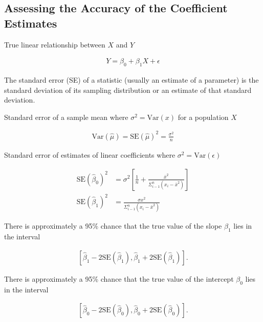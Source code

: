 \documentclass[]{article}
\newcommand{\var}{\mathrm{Var}}
\newcommand{\se}{\mathrm{SE}}
\begin{document}
\subsection{Assessing the Accuracy of the Coefficient
Estimates}\label{assessing-the-accuracy-of-the-coefficient-estimates}

True linear relationship between \(X\) and \(Y\)

\begin{align}
    Y = \beta_0 + \beta_1 X + \epsilon
\end{align}

The standard error (SE) of a statistic (usually an estimate of a
parameter) is the standard deviation of its sampling distribution or an
estimate of that standard deviation.

Standard error of a sample mean where \(\sigma^2 = \var(x)\) for a
population \(X\)

\begin{align}
    \var\left(\hat{\mu}\right) = \se\left(\hat{\mu}\right)^2 = \frac{\sigma^2}{n}
\end{align}

Standard error of estimates of linear coefficients where
\(\sigma^2 = \var(\epsilon)\)

\begin{align}
    \se\left(\hat{\beta}_0\right)^2 & = 
        \sigma^2\left[ 
            \frac{1}
                     {n} + 
            \frac{\bar{x}^2}
                     {\Sigma_{i - 1}^n\left(x_i - \bar{x}^2\right)} \right] 
            \nonumber \\
    \se\left(\hat{\beta}_1\right)^2 & = 
         \frac{\sigma{x}^2}
                    {\Sigma_{i - 1}^n \left(x_i - \bar{x}^2\right)}
\end{align}

There is approximately a 95\% chance that the true value of the slope
\(\beta_1\) lies in the interval

\begin{align}
    \left[  \hat{\beta}_1 - 2 \se\left( \hat{\beta}_1 \right),
                    \hat{\beta}_1 + 2 \se\left( \hat{\beta}_1 \right) 
                    \right].
\end{align}

There is approximately a 95\% chance that the true value of the
intercept \(\beta_0\) lies in the interval

\begin{align}
    \left[  \hat{\beta}_0 - 2 \se\left( \hat{\beta}_0 \right),
                    \hat{\beta}_0 + 2 \se\left( \hat{\beta}_0 \right) 
                    \right].
\end{align}
\end{document}
